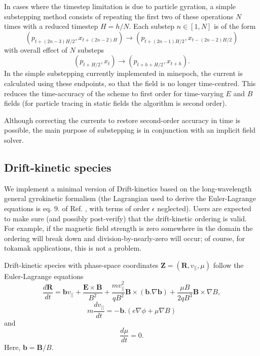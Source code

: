 \documentclass{article}
\begin{document}
In cases where the timestep limitation is due to particle gyration, a simple substepping method consists of repeating the first two of these operations $N$ times with a reduced timestep $H=h/N$. Each substep $n \in [1,N]$ is of the form
\begin{equation}
   (p_{t + (2 n - 3) H/2},x_{ t + (2 n -2 ) H} ) \rightarrow (p_{t + (2 n - 1) H/2},x_{t- (2 n -2 )H/2})
\end{equation}
with overall effect of $N$ substeps
  \begin{equation}
   (p_{t +  H/2},x_{ t} ) \rightarrow (p_{t + h + H/2},x_{t + h}).
\end{equation}
  In the simple substepping currently implemented in minepoch, the current is calculated using these endpoints, so that the field is no longer time-centred. This reduces the time-accuracy of the scheme to first order for time-varying $E$ and $B$ fields (for particle tracing in static fields the algorithm is second order).

Although correcting the currents to restore  second-order accuracy in time is possible, the main purpose of substepping is in conjunction with an implicit field solver.

\subsection{Drift-kinetic species}

We implement a minimal version of Drift-kinetics based on the long-wavelength general gyrokinetic formalism (the Lagrangian used to derive the Euler-Lagrange equations is eq. 9. of Ref. \cite{mcmillansharma}, with terms of order $\epsilon$ neglected). Users are expected to make sure (and possibly post-verify) that the drift-kinetic ordering is valid. For example, if the magnetic field strength is zero somewhere in the domain the ordering will break down and division-by-nearly-zero will occur; of course, for tokamak applications, this is not a problem.

Drift-kinetic species with phase-space coordinates $\mathbf{Z}=(\mathbf{R},v_{||},\mu)$ follow the Euler-Lagrange equations
\begin{equation}
  \frac{d \mathbf{R}}{dt} = \mathbf{b} v_{||}
  + \frac{\mathbf{E} \times \mathbf{B}}{B^2}
  + \frac{m v_{||}^2}{q B^2} \mathbf{B} \times \left( \mathbf{b} . \nabla \mathbf{b} \right)
  + \frac{\mu B}{2 q B^3} \mathbf{B} \times \nabla B,
\end{equation}
\begin{equation}
  m \frac{d v_{||}}{dt} = - \mathbf{b} . ( e \nabla \phi + \mu \nabla B )
\end{equation}
and
\begin{equation}
  \frac{d \mu}{dt} = 0.
\end{equation}
Here, $\mathbf{b} = \mathbf{B}/B$.
\end{document}
